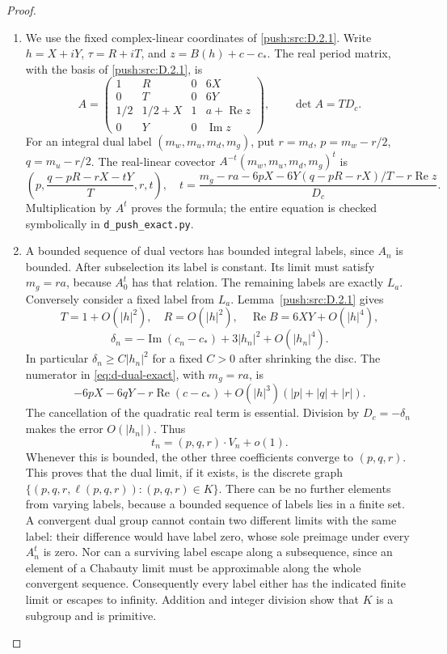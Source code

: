\begin{proof}
\begin{enumerate}[label=\arabic*.,leftmargin=*]
\item We use the fixed complex-linear coordinates of \ref{push:src:D.2.1}. Write
\(h=X+iY\), \(\tau=R+iT\), and
\(z=B(h)+c-c_*\). The real period matrix, with the basis of \ref{push:src:D.2.1},
is
\[
 A=\begin{pmatrix}
 1&R&0&6X\\
 0&T&0&6Y\\
 1/2&1/2+X&1&a+\operatorname{Re}z\\
 0&Y&0&\operatorname{Im}z
 \end{pmatrix},\qquad
 \det A=T D_c.
\]
For an integral dual label \((m_w,m_u,m_d,m_g)\), put
\(r=m_d\), \(p=m_w-r/2\), \(q=m_u-r/2\).
The real-linear covector \(A^{-t}(m_w,m_u,m_d,m_g)^t\) is
\begin{equation}\label{eq:d-dual-exact}
 \left(p,\frac{q-pR-rX-tY}{T},r,t\right),\quad
 t=\frac{m_g-ra-6pX-6Y(q-pR-rX)/T-r\operatorname{Re}z}{D_c}.
\end{equation}
Multiplication by \(A^t\) proves the formula; the entire equation is
checked symbolically in \texttt{d\_push\_exact.py}.

\item A bounded sequence of dual vectors has bounded integral labels,
since \(A_n\) is bounded. After subselection its label is constant.
Its limit must satisfy \(m_g=ra\), because
\(A_0^t\) has that relation. The remaining labels are exactly
\(L_a\). Conversely consider a fixed label from \(L_a\).
Lemma~\ref{push:src:D.2.1} gives
\[
 T=1+O(|h|^2),\quad R=O(|h|^2),\quad
 \operatorname{Re}B=6XY+O(|h|^4),
\]
\[
 \delta_n=-\operatorname{Im}(c_n-c_*)
                       +3|h_n|^2+O(|h_n|^4).
\]
In particular \(\delta_n\ge C|h_n|^2\) for a fixed \(C>0\)
after shrinking the disc. The numerator in
\eqref{eq:d-dual-exact}, with \(m_g=ra\), is
\[
 -6pX-6qY-r\operatorname{Re}(c-c_*)
       +O(|h|^3)(|p|+|q|+|r|).
\]
The cancellation of the quadratic real term is essential. Division
by \(D_c=-\delta_n\) makes the error \(O(|h_n|)\). Thus
\[
 t_n=(p,q,r)\cdot V_n+o(1).
\]
Whenever this is bounded, the other three coefficients converge to
\((p,q,r)\). This proves that the dual limit, if it exists, is the
discrete graph
\(\{(p,q,r,\ell(p,q,r)):(p,q,r)\in K\}\).
There can be no further elements from varying labels, because a
bounded sequence of labels lies in a finite set. A convergent dual
group cannot contain two different limits with the same label: their
difference would have label zero, whose sole preimage under every
\(A_n^t\) is zero. Nor can a surviving label escape along a
subsequence, since an element of a Chabauty limit must be approximable
along the whole convergent sequence. Consequently every label either
has the indicated finite limit or escapes to infinity. Addition and
integer division show that \(K\) is a subgroup and is primitive.


\end{enumerate}
\end{proof}
